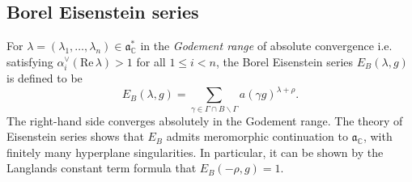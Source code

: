\documentclass[11pt]{amsart}
\def\R{\mathbb{R}}
\numberwithin{theorem}{section}
\numberwithin{equation}{section}
\theoremstyle{remark}
\theoremstyle{definition}
\newcommand{\C}{\mathbb{C}}
\newcommand{\re}{\mathrm{Re}\,}
\newcommand{\ga}{\mathfrak{a}}
\newcommand{\ignore}[1]{{}}
\begin{document}
\ignore{
Of particular interest is the case is where we take $f$ to be
\begin{equation*}
f_H(x) = \begin{cases} 1 & \mbox{if $x \leq H$} \\ 0 & \mbox{otherwise}\end{cases}
\end{equation*}
for some $H \in \R^+$. In this case, we have
\begin{equation*}
Mf_H(s) = \frac{H^s}{s}
\end{equation*}
for $\re s > 0$.
}


\subsection{Borel Eisenstein series}

For $\lambda = (\lambda_1, \ldots, \lambda_n) \in \ga^*_\C$ in the \emph{Godement range} of absolute convergence i.e. satisfying $\alpha^\vee_i(\re \lambda) > 1$ for all $1 \leq i < n$, the Borel Eisenstein series $E_B(\lambda,g)$ is defined to be
\begin{equation*}
E_B(\lambda, g) = \sum_{\gamma \in \Gamma \cap B \backslash \Gamma} a(\gamma g)^{\lambda + \rho}.
\end{equation*}
The right-hand side converges absolutely in the Godement range.
The theory of Eisenstein series shows that $E_B$ admits meromorphic continuation to $\ga_\C$, with finitely many hyperplane singularities. In particular, it can be shown by the Langlands constant term formula that $E_B(-\rho, g) = 1$.
\end{document}
